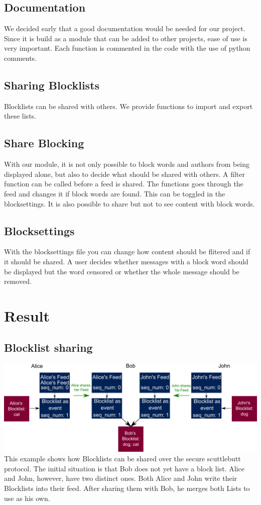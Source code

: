 \documentclass{article}
\begin{document}
\subsection{Documentation}
We decided early that a good documentation would be needed for our project.
Since it is build as a module that can be added to other projects, ease of use is very important.
Each function is commented in the code with the use of python comments. 

\subsection{Sharing Blocklists}
Blocklists can be shared with others. 
We provide functions to import and export these lists.

\subsection{Share Blocking}
With our module, it is not only possible to block words and authors from being displayed alone, but also to decide what should be shared with others.
A filter function can be called before a feed is shared. The functions goes through the feed and changes it if block words are found.
This can be toggled in the blocksettings.
It is also possible to share but not to see content with block words.

\subsection{Blocksettings}
With the blocksettings file you can change how content should be flitered and if it should be shared.
A user decides whether messages with a block word should be displayed but the word censored or whether the whole message should be removed.




\section{Result}

\subsection{Blocklist sharing}
\includegraphics[width=\textwidth]{graph2}
This example shows how Blocklists can be shared over the secure scuttlebutt protocol.
The initial situation is that Bob does not yet have a block list. Alice and John, however, have two distinct ones.
Both Alice and John write their Blocklists into their feed.
After sharing them with Bob, he merges both Lists to use as his own.
\end{document}
